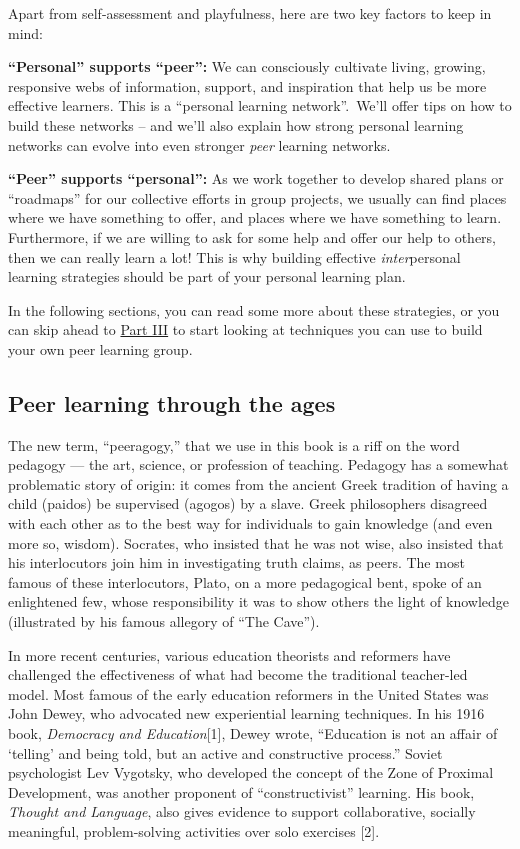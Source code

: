Apart from self-assessment and playfulness, here are two key factors to
keep in mind:

\textbf{``Personal'' supports ``peer'':} We can consciously cultivate
living, growing, responsive webs of information, support, and
inspiration that help us be more effective learners. This is a
``personal learning network''.~We'll offer tips on how to build these
networks -- and we'll also explain how strong personal learning networks
can evolve into even stronger \emph{peer} learning networks.

\textbf{``Peer'' supports ``personal'':} As we work together to develop
shared plans or ``roadmaps'' for our collective efforts in group
projects, we usually can find places where we have something to offer,
and places where we have something to learn. Furthermore, if we are
willing to ask for some help and offer our help to others, then we can
really learn a lot! This is why building effective \emph{inter}personal
learning strategies should be part of your personal learning plan.

In the following sections, you can read some more about these
strategies, or you can skip ahead to
\href{http://peeragogy.org/peeragogy-in-action/}{Part III} to start
looking at techniques you can use to build your own peer learning group.

\subsection{Peer learning through the ages}

The new term, ``peeragogy,'' that we use in this book is a riff on the
word pedagogy --- the art, science, or profession of teaching. Pedagogy
has a somewhat problematic story of origin: it comes from the ancient
Greek tradition of having a child (paidos) be supervised (agogos) by a
slave. Greek philosophers disagreed with each other as to the best way
for individuals to gain knowledge (and even more so, wisdom). Socrates,
who insisted that he was not wise, also insisted that his interlocutors
join him in investigating truth claims, as peers. The most famous of
these interlocutors, Plato, on a more pedagogical bent, spoke of an
enlightened few, whose responsibility it was to show others the light of
knowledge (illustrated by his famous allegory of ``The Cave'').

In more recent centuries, various education theorists and reformers have
challenged the effectiveness of what had become the traditional
teacher-led model. Most famous of the early education reformers in the
United States was John Dewey, who advocated new experiential learning
techniques. In his 1916 book, \emph{Democracy and Education}{[}1{]},
Dewey wrote, ``Education is not an affair of `telling' and being told,
but an active and constructive process.'' Soviet psychologist Lev
Vygotsky, who developed the concept of the Zone of Proximal Development,
was another proponent of ``constructivist'' learning. His book,
\emph{Thought and Language}, also gives evidence to support
collaborative, socially meaningful, problem-solving activities over solo
exercises {[}2{]}.

